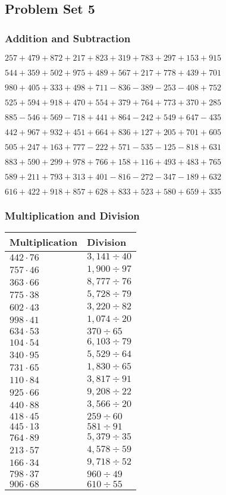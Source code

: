 \hypertarget{problem-set-5-2}{%
\subsection{Problem Set 5}\label{problem-set-5-2}}

\hypertarget{addition-and-subtraction-105}{%
\subsubsection{Addition and
Subtraction}\label{addition-and-subtraction-105}}

\(257 + 479 + 872 + 217 + 823 + 319 + 783 + 297 + 153 + 915\)

\(544 + 359 + 502 + 975 + 489 + 567 + 217 + 778 + 439 + 701\)

\(980 + 405 + 333 + 498 + 711 - 836 - 389 - 253 - 408 + 752\)

\(525 + 594 + 918 + 470 + 554 + 379 + 764 + 773 + 370 + 285\)

\(885 - 546 + 569 - 718 + 441 + 864 - 242 + 549 + 647 - 435\)

\(442 + 967 + 932 + 451 + 664 + 836 + 127 + 205 + 701 + 605\)

\(505 + 247 + 163 + 777 - 222 + 571 - 535 - 125 - 818 + 631\)

\(883 + 590 + 299 + 978 + 766 + 158 + 116 + 493 + 483 + 765\)

\(589 + 211 + 793 + 313 + 401 - 816 - 272 - 347 - 189 + 632\)

\(616 + 422 + 918 + 857 + 628 + 833 + 523 + 580 + 659 + 335\)

\hypertarget{multiplication-and-division-105}{%
\subsubsection{Multiplication and
Division}\label{multiplication-and-division-105}}

\begin{longtable}[]{@{}ll@{}}
\toprule
Multiplication & Division\tabularnewline
\midrule
\endhead
\(442 \cdot 76\) & \(3,141÷40\)\tabularnewline
\(757 \cdot 46\) & \(1,900÷97\)\tabularnewline
\(363 \cdot 66\) & \(8,777÷76\)\tabularnewline
\(775 \cdot 38\) & \(5,728÷79\)\tabularnewline
\(602 \cdot 43\) & \(3,220÷82\)\tabularnewline
\(998 \cdot 41\) & \(1,074÷20\)\tabularnewline
\(634 \cdot 53\) & \(370÷65\)\tabularnewline
\(104 \cdot 54\) & \(6,103÷79\)\tabularnewline
\(340 \cdot 95\) & \(5,529÷64\)\tabularnewline
\(731 \cdot 65\) & \(1,830÷65\)\tabularnewline
\(110 \cdot 84\) & \(3,817÷91\)\tabularnewline
\(925 \cdot 66\) & \(9,208÷22\)\tabularnewline
\(440 \cdot 88\) & \(3,566÷20\)\tabularnewline
\(418 \cdot 45\) & \(259÷60\)\tabularnewline
\(445 \cdot 13\) & \(581÷91\)\tabularnewline
\(764 \cdot 89\) & \(5,379÷35\)\tabularnewline
\(213 \cdot 57\) & \(4,578÷59\)\tabularnewline
\(166 \cdot 34\) & \(9,718÷52\)\tabularnewline
\(798 \cdot 37\) & \(960÷49\)\tabularnewline
\(906 \cdot 68\) & \(610÷55\)\tabularnewline
\bottomrule
\end{longtable}

